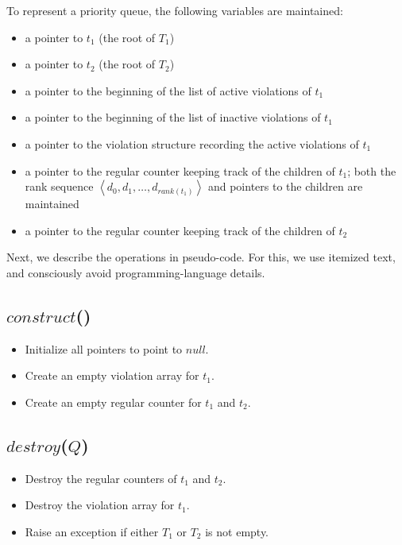 \documentclass{llncs}
\newcommand{\sequence}[1]{\left\langle#1\right\rangle}
\newcommand{\Construct}{\mbox{$\mathit{construct}$}}
\newcommand{\Destroy}{\mbox{$\mathit{destroy}$}}
\begin{document}
To represent a priority queue, the following variables are maintained:
\begin{itemize}
\item a pointer to $t_1$ (the root of $T_1$)
\item a pointer to $t_2$ (the root of $T_2$)
\item a pointer to the beginning of the list of active violations of
  $t_1$
\item a pointer to the beginning of the list of inactive violations of
  $t_1$
\item a pointer to the violation structure recording the active violations of $t_1$
\item a pointer to the regular counter keeping track of the children
  of $t_1$; both the rank sequence $\sequence{d_0, d_1,\ldots,
    d_{\mathit{rank}(t_1)}}$ and pointers to the children are
  maintained
\item a pointer to the regular counter keeping track of the children of $t_2$
\end{itemize}

\noindent
Next, we describe the operations in pseudo-code. For this, we use
itemized text, and consciously avoid programming-language details.

\subsection*{\Construct{}()}

\begin{itemize}
\item Initialize all pointers to point to $\mathit{null}$.
\item Create an empty violation array for $t_1$.
\item Create an empty regular counter for $t_1$ and $t_2$.
\end{itemize}

\subsection*{\Destroy{}($Q$)}

\begin{itemize}
\item Destroy the regular counters of $t_1$ and $t_2$.
\item Destroy the violation array for $t_1$.
\item Raise an exception if either $T_1$ or $T_2$ is not empty.
\end{itemize}
\end{document}
